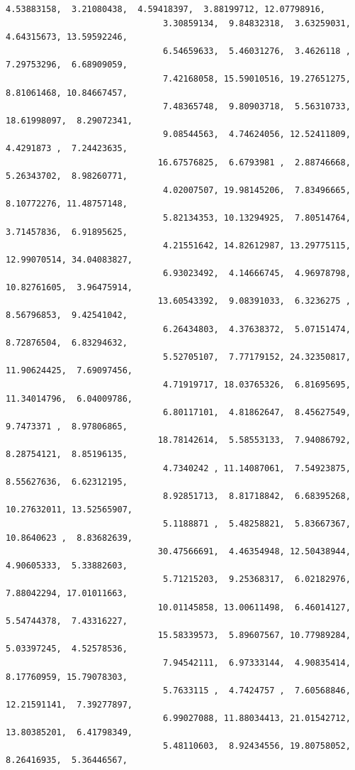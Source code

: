 \documentclass[11pt]{article}
\begin{document}
\begin{Verbatim}[commandchars=\\\{\}]
                               4.53883158,  3.21080438,  4.59418397,  3.88199712, 12.07798916,
                               3.30859134,  9.84832318,  3.63259031,  4.64315673, 13.59592246,
                               6.54659633,  5.46031276,  3.4626118 ,  7.29753296,  6.68909059,
                               7.42168058, 15.59010516, 19.27651275,  8.81061468, 10.84667457,
                               7.48365748,  9.80903718,  5.56310733, 18.61998097,  8.29072341,
                               9.08544563,  4.74624056, 12.52411809,  4.4291873 ,  7.24423635,
                              16.67576825,  6.6793981 ,  2.88746668,  5.26343702,  8.98260771,
                               4.02007507, 19.98145206,  7.83496665,  8.10772276, 11.48757148,
                               5.82134353, 10.13294925,  7.80514764,  3.71457836,  6.91895625,
                               4.21551642, 14.82612987, 13.29775115, 12.99070514, 34.04083827,
                               6.93023492,  4.14666745,  4.96978798, 10.82761605,  3.96475914,
                              13.60543392,  9.08391033,  6.3236275 ,  8.56796853,  9.42541042,
                               6.26434803,  4.37638372,  5.07151474,  8.72876504,  6.83294632,
                               5.52705107,  7.77179152, 24.32350817, 11.90624425,  7.69097456,
                               4.71919717, 18.03765326,  6.81695695, 11.34014796,  6.04009786,
                               6.80117101,  4.81862647,  8.45627549,  9.7473371 ,  8.97806865,
                              18.78142614,  5.58553133,  7.94086792,  8.28754121,  8.85196135,
                               4.7340242 , 11.14087061,  7.54923875,  8.55627636,  6.62312195,
                               8.92851713,  8.81718842,  6.68395268, 10.27632011, 13.52565907,
                               5.1188871 ,  5.48258821,  5.83667367, 10.8640623 ,  8.83682639,
                              30.47566691,  4.46354948, 12.50438944,  4.90605333,  5.33882603,
                               5.71215203,  9.25368317,  6.02182976,  7.88042294, 17.01011663,
                              10.01145858, 13.00611498,  6.46014127,  5.54744378,  7.43316227,
                              15.58339573,  5.89607567, 10.77989284,  5.03397245,  4.52578536,
                               7.94542111,  6.97333144,  4.90835414,  8.17760959, 15.79078303,
                               5.7633115 ,  4.7424757 ,  7.60568846, 12.21591141,  7.39277897,
                               6.99027088, 11.88034413, 21.01542712, 13.80385201,  6.41798349,
                               5.48110603,  8.92434556, 19.80758052,  8.26416935,  5.36446567,

\end{Verbatim}
\end{document}
